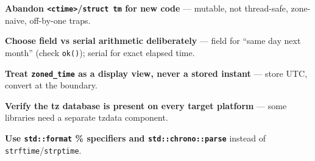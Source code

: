 \textbf{Abandon \texttt{<ctime>}/\texttt{struct tm} for new code} --- mutable, not thread-safe, zone-naive, off-by-one traps.

\textbf{Choose field vs serial arithmetic deliberately} --- field for ``same day next month'' (check \texttt{ok()}); serial for exact elapsed time.

\textbf{Treat \texttt{zoned\_time} as a display view, never a stored instant} --- store UTC, convert at the boundary.

\textbf{Verify the tz database is present on every target platform} --- some libraries need a separate tzdata component.

\textbf{Use \texttt{std::format} \% specifiers and \texttt{std::chrono::parse}} instead of \texttt{strftime}/\texttt{strptime}.
